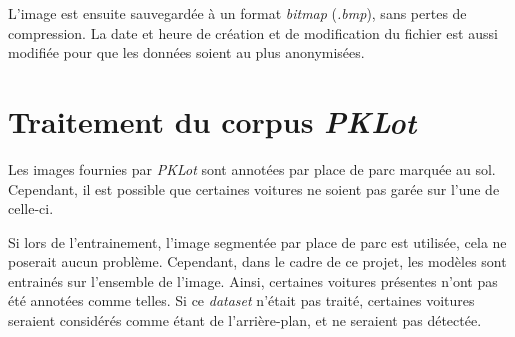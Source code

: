 L'image est ensuite sauvegardée à un format \textit{bitmap} (\textit{.bmp}), sans pertes de compression. La date et heure de création et de modification du fichier est aussi modifiée pour que les données soient au plus anonymisées.

\section{Traitement du corpus \textit{PKLot}} \label{realisation.dataset}

Les images fournies par \textit{PKLot} sont annotées par place de parc marquée au sol. Cependant, il est possible que certaines voitures ne soient pas garée sur l'une de celle-ci. 

Si lors de l'entrainement, l'image segmentée par place de parc est utilisée, cela ne poserait aucun problème. Cependant, dans le cadre de ce projet, les modèles sont entrainés sur l'ensemble de l'image. Ainsi, certaines voitures présentes n'ont pas été annotées comme telles. Si ce \textit{dataset} n'était pas traité, certaines voitures seraient considérés comme étant de l'arrière-plan, et ne seraient pas détectée. 

